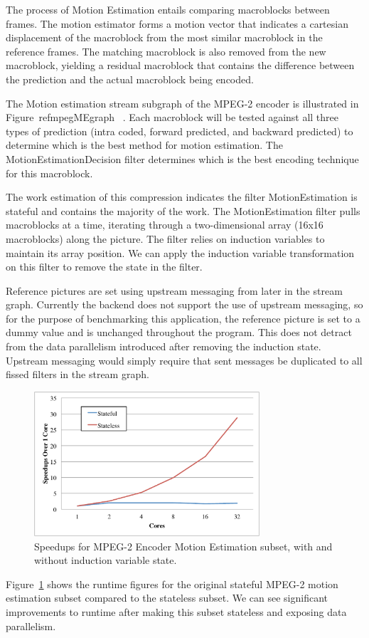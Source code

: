 The process of Motion Estimation entails comparing macroblocks between frames.  The motion estimator forms a motion vector that indicates a cartesian displacement of the macroblock from the most similar macroblock in the reference frames.  The matching macroblock is also removed from the new macroblock, yielding a residual macroblock that contains the difference between the prediction and the actual macroblock being encoded.  

The Motion estimation stream subgraph of the MPEG-2 encoder is illustrated in Figure~ref{mpegMEgraph} ~\cite{drake-thesis}.  Each macroblock will be tested against all three types of prediction (intra coded, forward predicted, and backward predicted) to determine which is the best method for motion estimation.  The MotionEstimationDecision filter determines which is the best encoding technique for this macroblock.

The work estimation of this compression indicates the filter MotionEstimation is stateful and contains the majority of the work.  The MotionEstimation filter pulls macroblocks at a time, iterating through a two-dimensional array (16x16 macroblocks) along the picture.  The filter relies on induction variables to maintain its array position.  We can apply the induction variable transformation on this filter to remove the state in the filter.

Reference pictures are set using upstream messaging from later in the stream graph.  Currently the backend does not support the use of upstream messaging, so for the purpose of benchmarking this application, the reference picture is set to a dummy value and is unchanged throughout the program.  This does not detract from the data parallelism introduced after removing the induction state.  Upstream messaging would simply require that sent messages be duplicated to all fissed filters in the stream graph.

\begin{figure}[t]
\includegraphics[width=3.3in]{figures/mpeg-results.pdf}
\caption{Speedups for MPEG-2 Encoder Motion Estimation subset, with and without induction variable state.  \protect\label{fig:mpeg-results}}
\end{figure}

Figure~\ref{fig:mpeg-results} shows the runtime figures for the original stateful MPEG-2 motion estimation subset compared to the stateless subset.  We can see significant improvements to runtime after making this subset stateless and exposing data parallelism.
